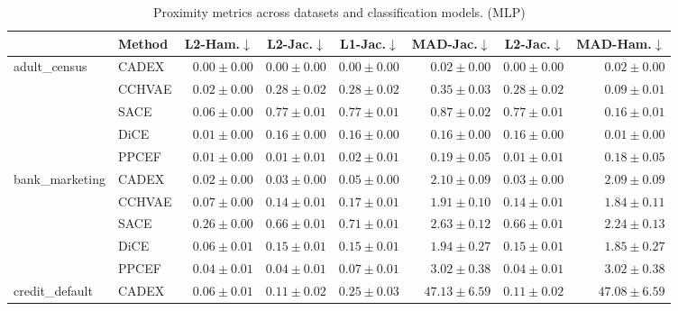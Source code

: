 \begin{table}[ht]
\centering
\caption{Proximity metrics across datasets and classification models. (MLP)}
\label{tab:proximity_metrics_mlpclassifier}
\begin{center}
\begin{sc}
\begin{scriptsize}
\begin{tabular}{l|l|rrrrrr}
\toprule
 & Method & L2-Ham.$\downarrow$ & L2-Jac.$\downarrow$ & L1-Jac.$\downarrow$ & MAD-Jac.$\downarrow$ & L2-Jac.$\downarrow$ & MAD-Ham.$\downarrow$ \\
\midrule
\multirow{5}{*}{adult\_census} & CADEX & $\boldsymbol{0.00\pm{0.00}}$ & $\boldsymbol{0.00\pm{0.00}}$ & $\boldsymbol{0.00\pm{0.00}}$ & $\boldsymbol{0.02\pm{0.00}}$ & $\boldsymbol{0.00\pm{0.00}}$ & $0.02\pm{0.00}$ \\
 & CCHVAE & $0.02\pm{0.00}$ & $0.28\pm{0.02}$ & $0.28\pm{0.02}$ & $0.35\pm{0.03}$ & $0.28\pm{0.02}$ & $0.09\pm{0.01}$ \\
 & SACE & $0.06\pm{0.00}$ & $0.77\pm{0.01}$ & $0.77\pm{0.01}$ & $0.87\pm{0.02}$ & $0.77\pm{0.01}$ & $0.16\pm{0.01}$ \\
 & DiCE & $0.01\pm{0.00}$ & $0.16\pm{0.00}$ & $0.16\pm{0.00}$ & $0.16\pm{0.00}$ & $0.16\pm{0.00}$ & $\boldsymbol{0.01\pm{0.00}}$ \\
 & PPCEF & $0.01\pm{0.00}$ & $0.01\pm{0.01}$ & $0.02\pm{0.01}$ & $0.19\pm{0.05}$ & $0.01\pm{0.01}$ & $0.18\pm{0.05}$ \\
\midrule
\multirow{5}{*}{bank\_marketing} & CADEX & $\boldsymbol{0.02\pm{0.00}}$ & $\boldsymbol{0.03\pm{0.00}}$ & $\boldsymbol{0.05\pm{0.00}}$ & $2.10\pm{0.09}$ & $\boldsymbol{0.03\pm{0.00}}$ & $2.09\pm{0.09}$ \\
 & CCHVAE & $0.07\pm{0.00}$ & $0.14\pm{0.01}$ & $0.17\pm{0.01}$ & $\boldsymbol{1.91\pm{0.10}}$ & $0.14\pm{0.01}$ & $\boldsymbol{1.84\pm{0.11}}$ \\
 & SACE & $0.26\pm{0.00}$ & $0.66\pm{0.01}$ & $0.71\pm{0.01}$ & $2.63\pm{0.12}$ & $0.66\pm{0.01}$ & $2.24\pm{0.13}$ \\
 & DiCE & $0.06\pm{0.01}$ & $0.15\pm{0.01}$ & $0.15\pm{0.01}$ & $1.94\pm{0.27}$ & $0.15\pm{0.01}$ & $1.85\pm{0.27}$ \\
 & PPCEF & $0.04\pm{0.01}$ & $0.04\pm{0.01}$ & $0.07\pm{0.01}$ & $3.02\pm{0.38}$ & $0.04\pm{0.01}$ & $3.02\pm{0.38}$ \\
\midrule
\multirow{5}{*}{credit\_default} & CADEX & $\boldsymbol{0.06\pm{0.01}}$ & $\boldsymbol{0.11\pm{0.02}}$ & $0.25\pm{0.03}$ & $47.13\pm{6.59}$ & $\boldsymbol{0.11\pm{0.02}}$ & $47.08\pm{6.59}$ \\

\end{tabular}
\end{scriptsize}
\end{sc}
\end{center}
\end{table}
